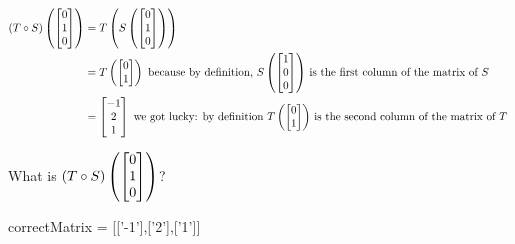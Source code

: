 \documentclass{ximera}
\begin{document}
\begin{question}
\begin{solution}
\begin{hint}
\begin{question}
	\end{question}
	\begin{question}
		\begin{solution}
		\begin{hint}
			\begin{align*}
				(T \circ S)\left(\begin{bmatrix}0\\1\\0\end{bmatrix}\right) &= T\left(S\left(\begin{bmatrix}0\\1\\0\end{bmatrix}\right)\right)\\
				&= T\left(\begin{bmatrix}0\\1\end{bmatrix}\right) \text{ because by definition, $S\left(\begin{bmatrix}1\\0\\0\end{bmatrix}\right)$ is the first column of the matrix of $S$}\\
				&=\begin{bmatrix}-1\\2\\1\end{bmatrix} \text{ we got lucky: by definition $T\left(\begin{bmatrix}0\\1\end{bmatrix}\right)$ is the second column of the matrix of $T$ }\\
			\end{align*}
		\end{hint}
		What is  $(T \circ S)\left(\begin{bmatrix}0\\1\\0\end{bmatrix}\right)$?
			\begin{matrix-answer}[name=M]
 			   correctMatrix = [['-1'],['2'],['1']]
 			 \end{matrix-answer}
		\end{solution}
		

\end{question}
\end{hint}
\end{solution}
\end{question}
\end{document}
